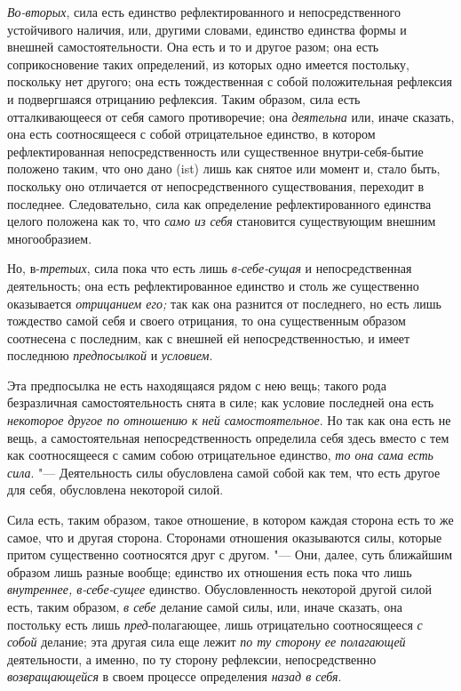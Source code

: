 {\em Во-вторых}, сила есть единство рефлектированного и
непосредственного устойчивого наличия, или, другими словами, единство
единства формы и внешней самостоятельности. Она есть и то и другое разом;
она есть соприкосновение таких определений, из которых одно имеется
постольку, поскольку нет другого; она есть тождественная с собой
положительная рефлексия и подвергшаяся отрицанию рефлексия. Таким образом,
сила есть отталкивающееся от себя самого противоречие; она
{\em деятельна} или, иначе сказать, она есть
соотносящееся с собой отрицательное единство, в котором рефлектированная
непосредственность или существенное внутри-себя-бытие положено таким, что
оно дано (ist) лишь как снятое или момент и, стало быть, поскольку оно
отличается от непосредственного существования, переходит в последнее.
Следовательно, сила как определение рефлектированного единства целого
положена как то, что {\em само из себя} становится
существующим внешним многообразием.

Но, в-{\em третьих}, сила пока что есть лишь
{\em в-себе-сущая} и непосредственная деятельность; она
есть рефлектированное единство и столь же существенно оказывается
{\em отрицанием его;} так как она разнится от
последнего, но есть лишь тождество самой себя и своего отрицания, то она
существенным образом соотнесена с последним, как с внешней ей
непосредственностью, и имеет последнюю {\em предпосылкой} и {\em условием}.

Эта предпосылка не есть находящаяся рядом с нею вещь; такого рода
безразличная самостоятельность снята в силе; как условие последней она есть
{\em некоторое другое по отношению к ней
самостоятельное}. Но так как она есть не вещь, а самостоятельная
непосредственность определила себя здесь вместо с тем как соотносящееся с
самим собою отрицательное единство, {\em то она сама
есть сила}. "--- Деятельность силы обусловлена самой собой как тем, что есть
другое для себя, обусловлена некоторой силой.

Сила есть, таким образом, такое отношение, в котором каждая сторона есть то
же самое, что и другая сторона. Сторонами отношения оказываются силы,
которые притом существенно соотносятся друг с другом. "--- Они, далее, суть
ближайшим образом лишь разные вообще; единство их отношения есть пока что
лишь {\em внутреннее, в-себе-сущее} единство.
Обусловленность некоторой другой силой есть, таким образом,
{\em в себе} делание самой силы, или, иначе сказать,
она постольку есть лишь {\em пред}{}-полагающее, лишь
отрицательно соотносящееся {\em с собой} делание; эта
другая сила еще лежит {\em по ту сторону ее полагающей}
деятельности, а именно, по ту сторону рефлексии, непосредственно
{\em возвращающейся} в своем процессе определения
{\em назад в себя}.


